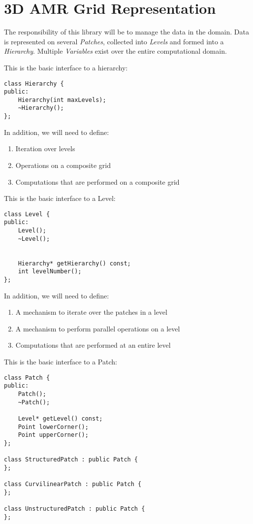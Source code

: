 
\section{3D AMR Grid Representation}

The responsibility of this library will be to manage the data in the
domain.  Data is represented on several {\em Patches}, collected into
{\em Levels} and formed into a {\em Hierarchy}.  Multiple {\em
Variables} exist over the entire computational domain.

\vspace{0.5in}

This is the basic interface to a hierarchy:
\begin{verbatim}
class Hierarchy {
public:
	Hierarchy(int maxLevels);
	~Hierarchy();
};
\end{verbatim}

In addition, we will need to define:
\begin{enumerate}
\item Iteration over levels
\item Operations on a composite grid
\item Computations that are performed on a composite grid
\end{enumerate}

\vspace{0.5in}


This is the basic interface to a Level:
\begin{verbatim}
class Level {
public:
	Level();
	~Level();


	Hierarchy* getHierarchy() const;	
	int levelNumber();
};
\end{verbatim}

In addition, we will need to define:
\begin{enumerate}
\item A mechanism to iterate over the patches in a level
\item A mechanism to perform parallel operations on a level
\item Computations that are performed at an entire level
\end{enumerate}


\vspace{0.5in}

This is the basic interface to a Patch:
\begin{verbatim}
class Patch {
public:
	Patch();
	~Patch();

	Level* getLevel() const;
	Point lowerCorner();
	Point upperCorner();
};

class StructuredPatch : public Patch {
};

class CurvilinearPatch : public Patch {
};

class UnstructuredPatch : public Patch {
};

\end{verbatim}

